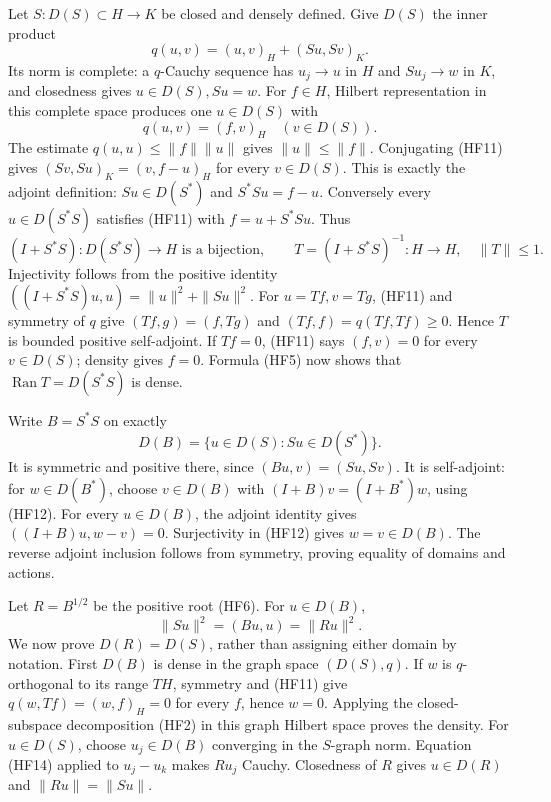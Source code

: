 \documentclass[
  11pt,
]{article}
\begin{document}
Let \(S:D(S)\subset H\to K\) be closed and densely defined. Give
\(D(S)\) the inner product \[
 q(u,v)=(u,v)_H+(Su,Sv)_K.
 \tag{HF10}
\] Its norm is complete: a \(q\)-Cauchy sequence has \(u_j\to u\) in
\(H\) and \(Su_j\to w\) in \(K\), and closedness gives
\(u\in D(S),Su=w\). For \(f\in H\), Hilbert representation in this
complete space produces one \(u\in D(S)\) with \[
 q(u,v)=(f,v)_H\quad(v\in D(S)).
 \tag{HF11}
\] The estimate \(q(u,u)\leq\|f\|\|u\|\) gives \(\|u\|\leq\|f\|\).
Conjugating (HF11) gives \((Sv,Su)_K=(v,f-u)_H\) for every
\(v\in D(S)\). This is exactly the adjoint definition: \(Su\in D(S^*)\)
and \(S^*Su=f-u\). Conversely every \(u\in D(S^*S)\) satisfies (HF11)
with \(f=u+S^*Su\). Thus \[
 (I+S^*S):D(S^*S)\to H
 \text{ is a bijection},\qquad
 T=(I+S^*S)^{-1}:H\to H,\quad \|T\|\leq1.
 \tag{HF12}
\] Injectivity follows from the positive identity
\(((I+S^*S)u,u)=\|u\|^2+\|Su\|^2\). For \(u=Tf,v=Tg\), (HF11) and
symmetry of \(q\) give \((Tf,g)=(f,Tg)\) and \((Tf,f)=q(Tf,Tf)\geq0\).
Hence \(T\) is bounded positive self-adjoint. If \(Tf=0\), (HF11) says
\((f,v)=0\) for every \(v\in D(S)\); density gives \(f=0\). Formula
(HF5) now shows that \(\operatorname{Ran}T=D(S^*S)\) is dense.

Write \(B=S^*S\) on exactly \[
 D(B)=\{u\in D(S):Su\in D(S^*)\}.
 \tag{HF13}
\] It is symmetric and positive there, since \((Bu,v)=(Su,Sv)\). It is
self-adjoint: for \(w\in D(B^*)\), choose \(v\in D(B)\) with
\((I+B)v=(I+B^*)w\), using (HF12). For every \(u\in D(B)\), the adjoint
identity gives \(((I+B)u,w-v)=0\). Surjectivity in (HF12) gives
\(w=v\in D(B)\). The reverse adjoint inclusion follows from symmetry,
proving equality of domains and actions.

Let \(R=B^{1/2}\) be the positive root (HF6). For \(u\in D(B)\), \[
 \|Su\|^2=(Bu,u)=\|Ru\|^2 .
 \tag{HF14}
\] We now prove \(D(R)=D(S)\), rather than assigning either domain by
notation. First \(D(B)\) is dense in the graph space \((D(S),q)\). If
\(w\) is \(q\)-orthogonal to its range \(TH\), symmetry and (HF11) give
\(q(w,Tf)=(w,f)_H=0\) for every \(f\), hence \(w=0\). Applying the
closed-subspace decomposition (HF2) in this graph Hilbert space proves
the density. For \(u\in D(S)\), choose \(u_j\in D(B)\) converging in the
\(S\)-graph norm. Equation (HF14) applied to \(u_j-u_k\) makes \(Ru_j\)
Cauchy. Closedness of \(R\) gives \(u\in D(R)\) and \(\|Ru\|=\|Su\|\).
\end{document}
